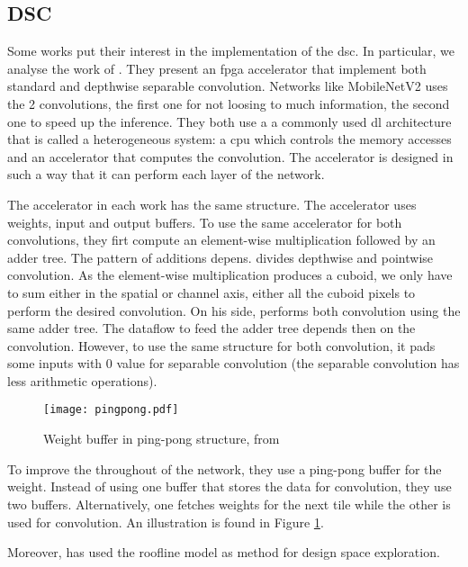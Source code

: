 \subsection{DSC} \label{subsec:impl_dsc}
%
%
Some works put their interest in the implementation of the \acrshort{dsc}. In particular, we analyse the work of \textcite{bai_cnn_2018, liu_fpga-based_2019}. They present an \acrshort{fpga} accelerator that implement both standard and depthwise separable convolution. Networks like MobileNetV2 uses the 2 convolutions, the first one for not loosing to much information, the second one to speed up the inference. They both use a a commonly used \acrshort{dl} architecture that is called a heterogeneous system: a \acrshort{cpu} which controls the memory accesses and an accelerator that computes the convolution. The accelerator is designed in such a way that it can perform each layer of the network.

The accelerator in each work has the same structure. The accelerator uses weights, input and output buffers. To use the same accelerator for both convolutions, they firt compute an element-wise multiplication followed by an adder tree. The pattern of additions depens. \textcite{bai_cnn_2018} divides depthwise and pointwise convolution. As the element-wise multiplication produces a cuboid, we only have to sum either in the spatial or channel axis, either all the cuboid pixels to perform the desired convolution. On his side, \textcite{liu_fpga-based_2019} performs both convolution using the same adder tree. The dataflow to feed the adder tree depends then on the convolution. However, to use the same structure for both convolution, it pads some inputs with 0 value for separable convolution (the separable convolution has less arithmetic operations).

\begin{figure}
	\centering
	\texttt{[image: pingpong.pdf]}
	\caption{Weight buffer in ping-pong structure, from \cite{bai_cnn_2018}}
	\label{fig:ping_pong_buffer}
\end{figure}
%
To improve the throughout of the network, they use a ping-pong buffer for the weight. Instead of using one buffer that stores the data for convolution, they use two buffers. Alternatively, one fetches weights for the next tile while the other is used for convolution. An illustration is found in Figure \ref{fig:ping_pong_buffer}.

Moreover, \textcite{liu_fpga-based_2019} has used the roofline model as method for design space exploration.
%
%
